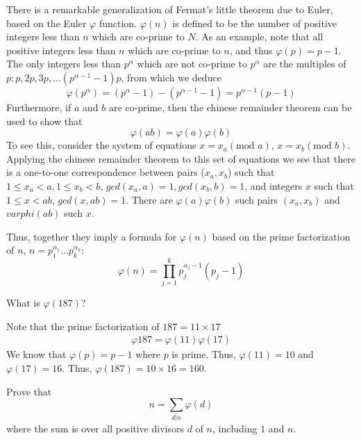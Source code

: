 There is a remarkable generalization of Fermat's little theorem due to Euler, based on the Euler $\varphi$ function. $\varphi(n)$ is defined to be the number of positive integers less than $n$ which are co-prime to $N$. As an example, note that all positive integers less than $n$ which are co-prime to $n$, and thus $\varphi(p)=p-1$. The only integers less than $p^{\alpha}$ which are not co-prime to $p^{\alpha}$ are the multiples of $p: p,2p,3p,\ldots (p^{\alpha -1}-1)p$, from which we deduce
\[
\varphi(p^{\alpha}) =(p^{\alpha}-1) - (p^{\alpha -1}-1)=p^{\alpha-1} (p-1)
\]
Furthermore, if $a$ and $b$ are co-prime, then the chinese remainder theorem can be used to show that
\[
\varphi(ab)=\varphi(a)\varphi(b)
\]
To see this, consider the system of equations $x=x_a (\text{mod }a)$, $x=x_b (\text{mod }b)$. Applying the chinese remainder theorem to this set of equations we see that there is a one-to-one correspondence between pairs ($x_a,x_b$) such that $1 \leq x_a <a, 1\leq x_b < b$, $gcd(x_a,a)=1, gcd(x_b,b)=1$, and integers $x$ such that $1\leq x <ab$, $gcd(x,ab)=1$. There are $\varphi(a)\varphi(b)$ such pairs $(x_a,x_b)$ and $varphi(ab)$ such $x$.

Thus, together they imply a formula for $\varphi(n)$ based on the prime factorization of $n$, $n=p_1^{\alpha_1}\ldots p_k^{\alpha_k}$:
\[
\varphi(n)=\prod_{j=1}^k p_j^{\alpha_j-1}(p_j-1)
\]
\begin{example}
    What is $\varphi(187)$?

Note that the prime factorization of $187 = 11 \times 17$
    \begin{align*}
        \varphi{187}=\varphi(11)\varphi(17)
    \end{align*}
    We know that $\varphi(p)=p-1$ where $p$ is prime. Thus, $\varphi(11)=10$ and $\varphi(17)=16$. Thus,
    $\varphi(187) =10 \times 16 = 160$.
\end{example}
\begin{example}
    Prove that
    \[
    n = \sum_{d|n} \varphi(d)
    \]
    where the sum is over all positive divisors $d$ of $n$, including $1$ and $n$.
\end{example}

